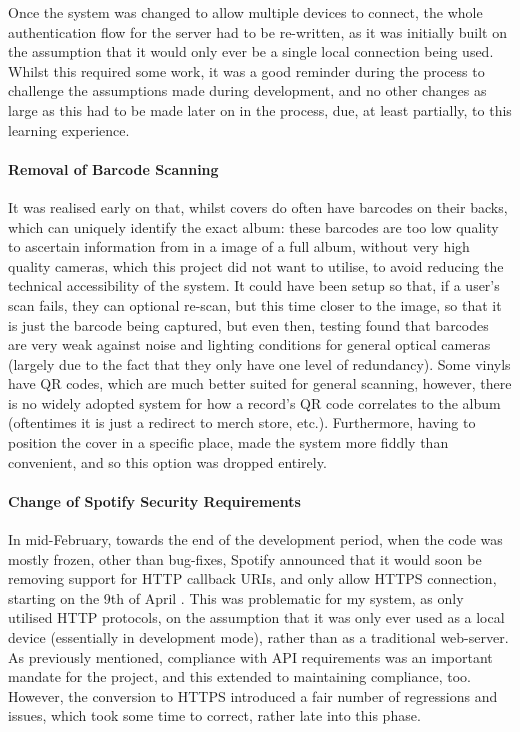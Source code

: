                 Once the system was changed to allow multiple devices to connect, the whole authentication flow for the server had to be re-written, as it was initially built on the assumption that it would only ever be a single local connection being used. Whilst this required some work, it was a good reminder during the process to challenge the assumptions made during development, and no other changes as large as this had to be made later on in the process, due, at least partially, to this learning experience.
    
                \paragraph{Removal of Barcode Scanning}
    
                It was realised early on that, whilst covers do often have barcodes on their backs, which can uniquely identify the exact album: these barcodes are too low quality to ascertain information from in a image of a full album, without very high quality cameras, which this project did not want to utilise, to avoid reducing the technical accessibility of the system. It could have been setup so that, if a user's scan fails, they can optional re-scan, but this time closer to the image, so that it is just the barcode being captured, but even then, testing found that barcodes are very weak against noise and lighting conditions for general optical cameras (largely due to the fact that they only have one level of redundancy). Some vinyls have QR codes, which are much better suited for general scanning, however, there is no widely adopted system for how a record's QR code correlates to the album (oftentimes it is just a redirect to merch store, etc.). Furthermore, having to position the cover in a specific place, made the system more fiddly than convenient, and so this option was dropped entirely.
    
                \paragraph{Change of Spotify Security Requirements}
    
                In mid-February, towards the end of the development period, when the code was mostly frozen, other than bug-fixes, Spotify announced that it would soon be removing support for HTTP callback URIs, and only allow HTTPS connection, starting on the 9th of April \cite{spotify2025security}. This was problematic for my system, as only utilised HTTP protocols, on the assumption that it was only ever used as a local device (essentially in development mode), rather than as a traditional web-server. As previously mentioned, compliance with API requirements was an important mandate for the project, and this extended to maintaining compliance, too. However, the conversion to HTTPS introduced a fair number of regressions and issues, which took some time to correct, rather late into this phase.
    
